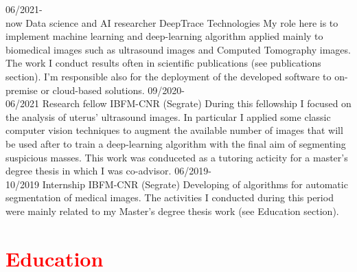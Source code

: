\documentclass[a4paper]{friggeri-cv}
\begin{document}
\begin{entrylist}
	\entry
	{06/2021-\\now}
	{Data science and AI researcher}
	{DeepTrace Technologies}
	{My role here is to implement machine learning and deep-learning algorithm applied mainly to biomedical images such as ultrasound images and Computed Tomography images. The work I conduct results often in scientific publications (see publications section). I'm responsible also for the deployment of the developed software to on-premise or cloud-based solutions.}
	\entry
	{09/2020-\\06/2021}
	{Research fellow}
	{IBFM-CNR (Segrate)}
	{During this fellowship I focused on the analysis of uterus' ultrasound images. In particular I applied some classic computer vision techniques to augment the available number of images that will be used after to train a deep-learning algorithm with the final aim of segmenting suspicious masses. This work was conduceted as a tutoring acticity for a master's degree thesis in which I was co-advisor.}
	\entry
	{06/2019-\\10/2019}
	{Internship}
	{IBFM-CNR (Segrate)}
	{Developing of algorithms for automatic segmentation of medical images. The activities I conducted during this period were mainly related to my Master's degree thesis work (see Education section).}
\end{entrylist}

\section{\textcolor{red}{Education}}
\end{document}
